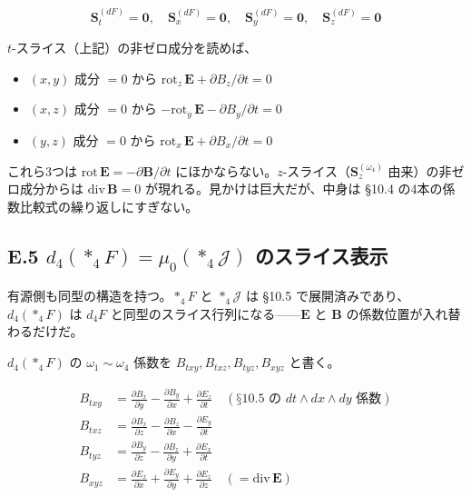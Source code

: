 \documentclass[a4paper,12pt,openany]{book}
\begin{document}
\[
\mathbf{S}_{t}^{(dF)} = \mathbf{0},\quad
\mathbf{S}_{x}^{(dF)} = \mathbf{0},\quad
\mathbf{S}_{y}^{(dF)} = \mathbf{0},\quad
\mathbf{S}_{z}^{(dF)} = \mathbf{0}
\]

\(t\)-スライス（上記）の非ゼロ成分を読めば、

\begin{itemize}
\item
  \((x,y)\) 成分 \(=0\) から
  \(\mathrm{rot}_z\,\mathbf{E} + \partial B_z/\partial t = 0\)
\item
  \((x,z)\) 成分 \(=0\) から
  \(-\mathrm{rot}_y\,\mathbf{E} - \partial B_y/\partial t = 0\)
\item
  \((y,z)\) 成分 \(=0\) から
  \(\mathrm{rot}_x\,\mathbf{E} + \partial B_x/\partial t = 0\)
\end{itemize}

これら3つは
\(\mathrm{rot}\,\mathbf{E} = -\partial\mathbf{B}/\partial t\)
にほかならない。\(z\)-スライス（\(\mathbf{S}_{z}^{(\omega_4)}\)
由来）の非ゼロ成分からは \(\mathrm{div}\,\mathbf{B} = 0\)
が現れる。見かけは巨大だが、中身は §10.4
の4本の係数比較式の繰り返しにすぎない。

\hypertarget{e.5-d_4ast_4f-mu_0ast_4mathcalj-ux306eux30b9ux30e9ux30a4ux30b9ux8868ux793a}{%
\subsection*{\texorpdfstring{E.5
\(d_4(\ast_4F) = \mu_0(\ast_4\mathcal{J})\)
のスライス表示}{E.5 d\_4(\textbackslash ast\_4F) = \textbackslash mu\_0(\textbackslash ast\_4\textbackslash mathcal\{J\}) のスライス表示}}\label{e.5-d_4ast_4f-mu_0ast_4mathcalj-ux306eux30b9ux30e9ux30a4ux30b9ux8868ux793a}}

有源側も同型の構造を持つ。\(\ast_4F\) と \(\ast_4\mathcal{J}\) は §10.5
で展開済みであり、\(d_4(\ast_4F)\) は \(d_4F\)
と同型のスライス行列になる——\(\mathbf{E}\) と \(\mathbf{B}\)
の係数位置が入れ替わるだけだ。

\(d_4(\ast_4F)\) の \(\omega_1\sim\omega_4\) 係数を
\(B_{txy}, B_{txz}, B_{tyz}, B_{xyz}\) と書く。

\[
\begin{aligned}
B_{txy} &= \frac{\partial B_x}{\partial y} - \frac{\partial B_y}{\partial x} + \frac{\partial E_z}{\partial t}
\quad (\text{§10.5 の } dt\wedge dx\wedge dy \text{ 係数}) \\[6pt]
B_{txz} &= \frac{\partial B_x}{\partial z} - \frac{\partial B_z}{\partial x} - \frac{\partial E_y}{\partial t} \\[6pt]
B_{tyz} &= \frac{\partial B_y}{\partial z} - \frac{\partial B_z}{\partial y} + \frac{\partial E_x}{\partial t} \\[6pt]
B_{xyz} &= \frac{\partial E_x}{\partial x} + \frac{\partial E_y}{\partial y} + \frac{\partial E_z}{\partial z}
\quad (= \mathrm{div}\,\mathbf{E})
\end{aligned}
\]
\end{document}
